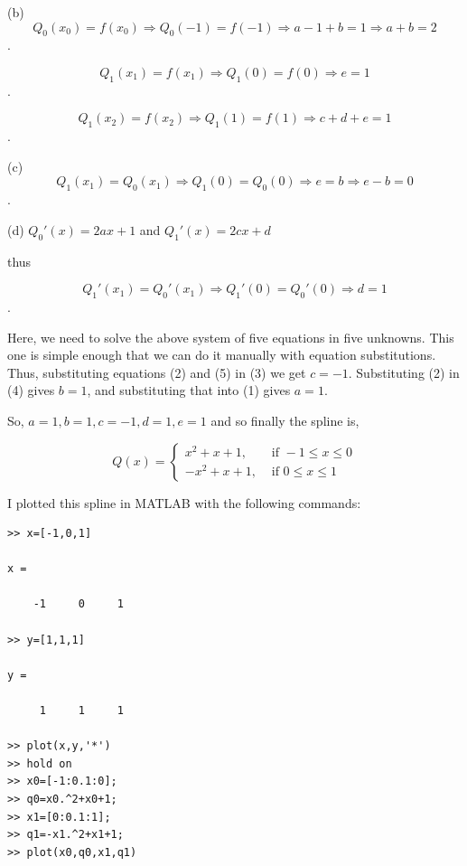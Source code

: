 \documentclass [titlepage,12pt,letter] {article}
\begin{document}
(b) \begin{equation}Q_0(x_0)=f(x_0) \Rightarrow Q_0(-1)=f(-1) \Rightarrow a-1+b=1 \Rightarrow \boxed{a+b=2} \end{equation}.

\begin{equation}Q_1(x_1)=f(x_1) \Rightarrow Q_1(0)=f(0) \Rightarrow \boxed{e=1}\end{equation}.

\begin{equation}Q_1(x_2)=f(x_2) \Rightarrow Q_1(1)=f(1) \Rightarrow \boxed{c+d+e=1}\end{equation}.

(c) \begin{equation}Q_1(x_1)=Q_0(x_1) \Rightarrow Q_1(0)=Q_0(0) \Rightarrow e=b \Rightarrow \boxed{e-b=0}\end{equation}.

(d) $Q_0'(x) = 2ax+1$ and $Q_1'(x)=2cx+d$

thus

\begin{equation}Q_1'(x_1)=Q_0'(x_1) \Rightarrow Q_1'(0)=Q_0'(0) \Rightarrow \boxed{d=1}\end{equation}.

Here, we need to solve the above system of five equations in five unknowns. This one is simple enough that we can do it manually with equation substitutions. Thus, substituting equations (2) and (5) in (3) we get $c=-1$. Substituting (2) in (4) gives $b=1$, and substituting that into (1) gives $a=1$.


So, $a=1, b=1, c=-1,d=1,e=1$ and so finally the spline is,

\[
Q(x) = \begin{cases}
x^2+x+1, & \text{ if } -1 \leq x \leq 0 \\
-x^2+x+1, & \text{ if } 0 \leq x \leq 1
\end{cases}
\]

I plotted this spline in MATLAB with the following commands:

\begin{verbatim}
>> x=[-1,0,1]

x =

    -1     0     1

>> y=[1,1,1]

y =

     1     1     1

>> plot(x,y,'*')
>> hold on
>> x0=[-1:0.1:0];
>> q0=x0.^2+x0+1;
>> x1=[0:0.1:1];
>> q1=-x1.^2+x1+1;
>> plot(x0,q0,x1,q1)
\end{verbatim}
\end{document}
